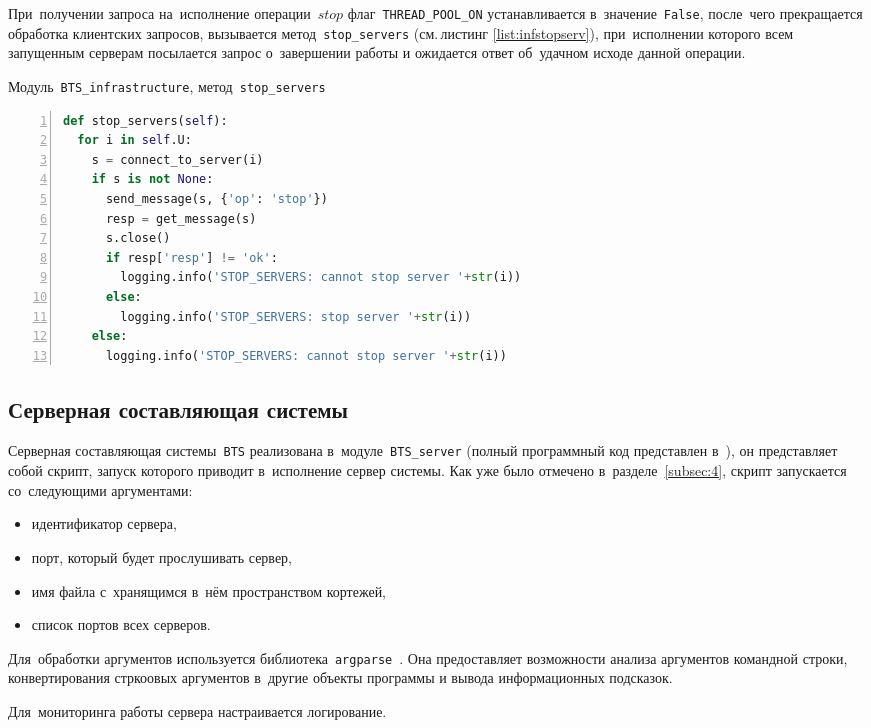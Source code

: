 При~получении запроса на~исполнение операции~$stop$ флаг~\texttt{THREAD_POOL_ON} устанавливается в~значение~\texttt{False}, после~чего прекращается обработка клиентских запросов, вызывается метод~\texttt{stop_servers} (см.\,листинг \ref{list:infstopserv}), при~исполнении которого всем запущенным серверам посылается запрос о~завершении работы и ожидается ответ об~удачном исходе данной операции.
\begin{ListingEnv}\caption{Модуль~\texttt{BTS\_infrastructure}, метод~\texttt{stop\_servers}}\label{list:infstopserv}
	\begin{lstlisting}[language=Python, numbers=left]
def stop_servers(self):
  for i in self.U:
    s = connect_to_server(i)
    if s is not None:
      send_message(s, {'op': 'stop'})
      resp = get_message(s)
      s.close()
      if resp['resp'] != 'ok':
        logging.info('STOP_SERVERS: cannot stop server '+str(i))
      else:
        logging.info('STOP_SERVERS: stop server '+str(i))
    else:
      logging.info('STOP_SERVERS: cannot stop server '+str(i))
	\end{lstlisting}
\end{ListingEnv}


\subsection{Серверная составляющая системы}\label{subsec:5}
Серверная составляющая системы~\texttt{BTS} реализована в~модуле~\texttt{BTS_server} (полный программный код представлен в~\autocite{mybts}), он представляет собой скрипт, запуск которого приводит в~исполнение сервер системы. Как уже было отмечено в~разделе~\ref{subsec:4}, скрипт запускается со~следующими аргументами:
\begin{itemize}
	\item идентификатор сервера,
	\item порт, который будет прослушивать сервер,
	\item имя файла с~хранящимся в~нём пространством кортежей,
	\item список портов всех серверов.
\end{itemize}
Для~обработки аргументов используется библиотека~\texttt{argparse}~\autocite{argparse}. Она предоставляет возможности анализа аргументов командной строки, конвертирования стркоовых аргументов в~другие объекты программы и вывода информационных подсказок.

Для~мониторинга работы сервера настраивается логирование.

